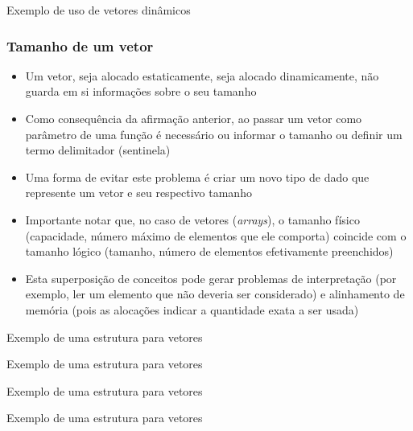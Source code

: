 \begin{frame}[fragile]{Exemplo de uso de vetores dinâmicos}
\end{frame}

\begin{frame}

	\frametitle{Tamanho de um vetor}

	\begin{itemize}

		\item Um vetor, seja alocado estaticamente, seja alocado 
		dinamicamente, {não guarda} em si informações sobre o 
		seu tamanho

		\item Como consequência da afirmação anterior, ao passar um 
		vetor como parâmetro de uma função é necessário ou 
		{informar} o tamanho ou {definir} um termo 
		delimitador (sentinela)

		\item Uma forma de evitar este problema é criar um 
		{novo tipo de dado} que represente um vetor e seu
		respectivo tamanho

        \item Importante notar que, no caso de vetores (\textit{arrays}), o tamanho físico
        (capacidade, número máximo de elementos que ele comporta) coincide com o tamanho lógico
        (tamanho, número de elementos efetivamente preenchidos)

        \item Esta superposição de conceitos pode gerar problemas de interpretação (por exemplo,
            ler um elemento que não deveria ser considerado) e alinhamento de memória (pois as
            alocações indicar a quantidade exata a ser usada)
	\end{itemize}

\end{frame}

\begin{frame}[fragile]{Exemplo de uma estrutura para vetores}
\end{frame}

\begin{frame}[fragile]{Exemplo de uma estrutura para vetores}
\end{frame}

\begin{frame}[fragile]{Exemplo de uma estrutura para vetores}
\end{frame}

\begin{frame}[fragile]{Exemplo de uma estrutura para vetores}
\end{frame}
